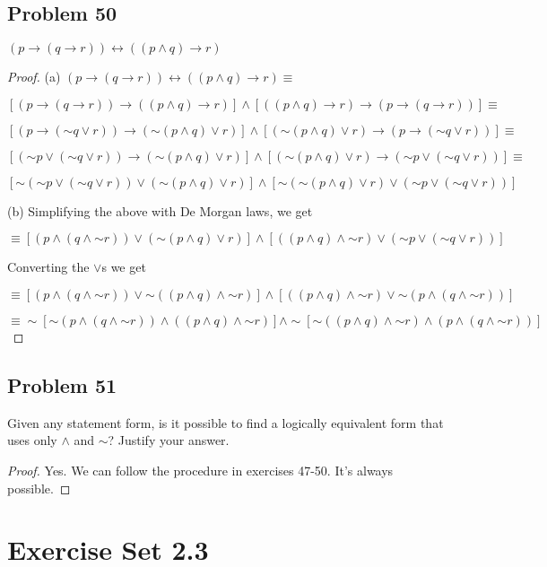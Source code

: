 \documentclass[14pt]{extarticle}
\newcommand{\bic}{\leftrightarrow}
\begin{document}
\subsection{Problem 50}
$(p \to (q \to r)) \bic ((p \wedge q) \to r)$
\begin{proof}
(a) $(p \to (q \to r)) \bic ((p \wedge q) \to r) \equiv $

$[(p \to (q \to r)) \to ((p \wedge q) \to r)] \wedge [((p \wedge q) \to r) \to
(p \to (q \to r))] \equiv$

$[(p \to ({\sim q} \vee r)) \to ({\sim (p \wedge q)} \vee r)] \wedge [({\sim (p
\wedge q)} \vee r) \to (p \to ({\sim q} \vee r))] \equiv$

$[({\sim p} \vee ({\sim q} \vee r)) \to ({\sim (p \wedge q)} \vee r)] \wedge
[({\sim (p \wedge q)} \vee r) \to ({\sim p} \vee ({\sim q} \vee r))] \equiv$

$[{\sim ({\sim p} \vee ({\sim q} \vee r))} \vee ({\sim (p \wedge q)} \vee r)]
\wedge [{\sim ({\sim (p \wedge q)} \vee r)} \vee ({\sim p} \vee ({\sim q} \vee
r))]$

(b) Simplifying the above with De Morgan laws, we get

$\equiv [(p \wedge (q \wedge {\sim r})) \vee ({\sim (p \wedge q)} \vee r)]
\wedge [((p \wedge q) \wedge {\sim r}) \vee ({\sim p} \vee ({\sim q} \vee r))]$

Converting the $\vee$s we get

$\equiv [(p \wedge (q \wedge {\sim r})) \vee {\sim((p \wedge q) \wedge {\sim
r})}] \wedge [((p \wedge q) \wedge {\sim r}) \vee {\sim(p \wedge (q \wedge {\sim
r}))}]$

$\equiv \sim[{\sim (p \wedge (q \wedge {\sim r}))} \wedge ((p \wedge q) \wedge
{\sim r})] \wedge \sim[{\sim ((p \wedge q) \wedge {\sim r})} \wedge (p \wedge (q
\wedge {\sim r}))]$
\end{proof}

\subsection{Problem 51}
Given any statement form, is it possible to find a logically equivalent form
that uses only $\wedge$ and $\sim$? Justify your answer.

\begin{proof}
Yes. We can follow the procedure in exercises 47-50. It's always possible.
\end{proof}

\section{Exercise Set 2.3}
\end{document}
